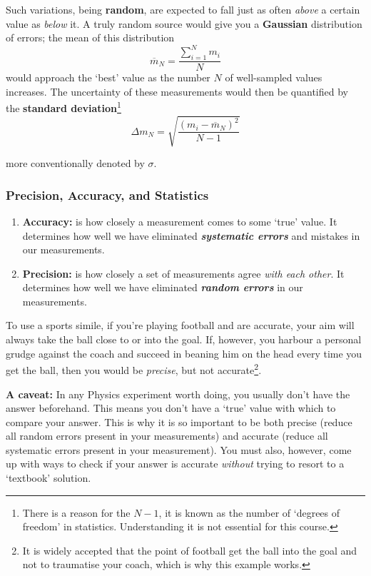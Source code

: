 Such variations, being \textbf{random}, are expected to fall just as often \textit{above} a certain value as \textit{below} it. A truly random source would give you a \textbf{Gaussian} distribution of errors; the mean of this distribution $$\overline{m}_N = \frac{\sum_{i=1}^{N}{m_i}}{N}$$ would approach the `best' value as the number $N$ of well-sampled values increases. The uncertainty of these measurements would then be quantified by the \textbf{standard deviation}\footnote{There is a reason for the $N-1$, it is known as the number of `degrees of freedom' in statistics. Understanding it is not essential for this course.} $$\Delta m_N = \sqrt{\frac{(m_i - \overline{m}_N)^2}{N-1}}$$

more conventionally denoted by $\sigma$.


\subsubsection{Precision, Accuracy, and Statistics}

\begin{enumerate}
    \item \textbf{Accuracy:} is how closely a measurement comes to some `true' value. It determines how well we have eliminated \textbf{\textit{systematic errors}} and mistakes in our measurements.
    \item \textbf{Precision:} is how closely a set of measurements agree \textit{with each other}. It determines how well we have eliminated \textbf{\textit{random errors}} in our measurements.
\end{enumerate}

To use a sports simile, if you're playing football and are accurate, your aim will always take the ball close to or into the goal. If, however, you harbour a personal grudge against the coach and succeed in beaning him on the head every time you get the ball, then you would be \textit{precise}, but not accurate\footnote{It is widely accepted that the point of football get the ball into the goal and not to traumatise your coach, which is why this example works.}.

\textbf{A caveat:} In any Physics experiment worth doing, you usually don't have the answer beforehand. This means you don't have a `true' value with which to compare your answer. This is why it is so important to be both precise (reduce all random errors present in your measurements) and accurate (reduce all systematic errors present in your measurement). You must also, however, come up with ways to check if your answer is accurate \textit{without} trying to resort to a `textbook' solution.

